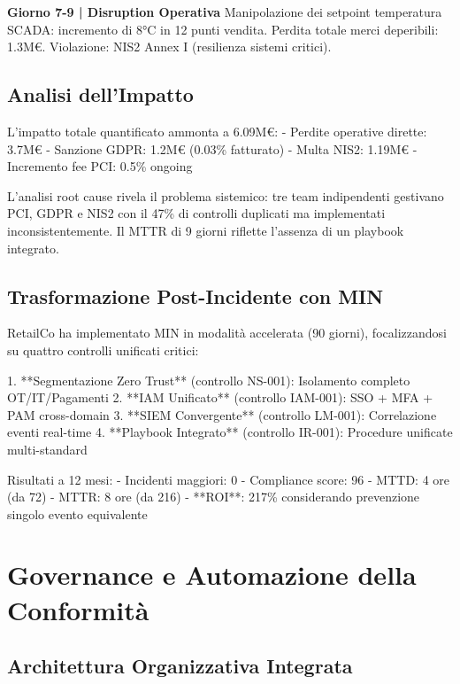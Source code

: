 \textbf{Giorno 7-9 | Disruption Operativa}
Manipolazione dei setpoint temperatura SCADA: incremento di 8°C in 12 punti vendita. Perdita totale merci deperibili: 1.3M€. Violazione: NIS2 Annex I (resilienza sistemi critici).

\subsection{\texorpdfstring{Analisi dell'Impatto}{4.4.2 - Analisi dell'Impatto}}

L'impatto totale quantificato ammonta a 6.09M€:
- Perdite operative dirette: 3.7M€
- Sanzione GDPR: 1.2M€ (0.03\% fatturato)
- Multa NIS2: 1.19M€
- Incremento fee PCI: 0.5\% ongoing

L'analisi root cause rivela il problema sistemico: tre team indipendenti gestivano PCI, GDPR e NIS2 con il 47\% di controlli duplicati ma implementati inconsistentemente. Il MTTR di 9 giorni riflette l'assenza di un playbook integrato.

\subsection{\texorpdfstring{Trasformazione Post-Incidente con MIN}{4.4.3 - Trasformazione con MIN}}

RetailCo ha implementato MIN in modalità accelerata (90 giorni), focalizzandosi su quattro controlli unificati critici:

1. **Segmentazione Zero Trust** (controllo NS-001): Isolamento completo OT/IT/Pagamenti
2. **IAM Unificato** (controllo IAM-001): SSO + MFA + PAM cross-domain
3. **SIEM Convergente** (controllo LM-001): Correlazione eventi real-time
4. **Playbook Integrato** (controllo IR-001): Procedure unificate multi-standard

Risultati a 12 mesi:
- Incidenti maggiori: 0
- Compliance score: 96%
- MTTD: 4 ore (da 72)
- MTTR: 8 ore (da 216)
- **ROI**: 217\% considerando prevenzione singolo evento equivalente

\section{\texorpdfstring{Governance e Automazione della Conformità}{4.5 - Governance e Automazione}}
\label{sec:governance}

\subsection{\texorpdfstring{Architettura Organizzativa Integrata}{4.5.1 - Architettura Organizzativa}}

